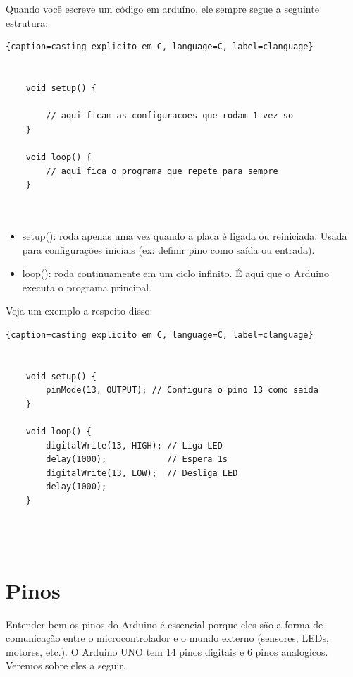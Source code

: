 \documentclass{report}
\begin{document}
	
	Quando você escreve um código em arduíno, ele sempre segue a seguinte estrutura:
	
	
	\begin{center}
		
		\begin{lstlisting}{caption=casting explicito em C, language=C, label=clanguage}
			
					
	void setup() {
		
		// aqui ficam as configuracoes que rodam 1 vez so
	}
				
	void loop() {
		// aqui fica o programa que repete para sempre
	}
	
			
		\end{lstlisting}
	\end{center}
	
	

	
	\begin{itemize}
		\item setup(): roda apenas uma vez quando a placa é ligada ou reiniciada. Usada para configurações iniciais (ex: definir pino como saída ou entrada).
		\item loop(): roda continuamente em um ciclo infinito. É aqui que o Arduino executa o programa principal.
	\end{itemize}
	
	Veja um exemplo a respeito disso:
	
		
	\begin{center}
		
		\begin{lstlisting}{caption=casting explicito em C, language=C, label=clanguage}
			
			
	void setup() {
		pinMode(13, OUTPUT); // Configura o pino 13 como saida
	}

	void loop() {
		digitalWrite(13, HIGH); // Liga LED
		delay(1000);            // Espera 1s
		digitalWrite(13, LOW);  // Desliga LED
		delay(1000);
	}

			
			
		\end{lstlisting}
	\end{center}
	

	\section{Pinos}
	
	Entender bem os pinos do Arduino é essencial porque eles são a forma de comunicação entre o microcontrolador e o mundo externo (sensores, LEDs, motores, etc.). O Arduino UNO tem 14 pinos digitais e 6 pinos analogicos. Veremos sobre eles a seguir.
\end{document}
